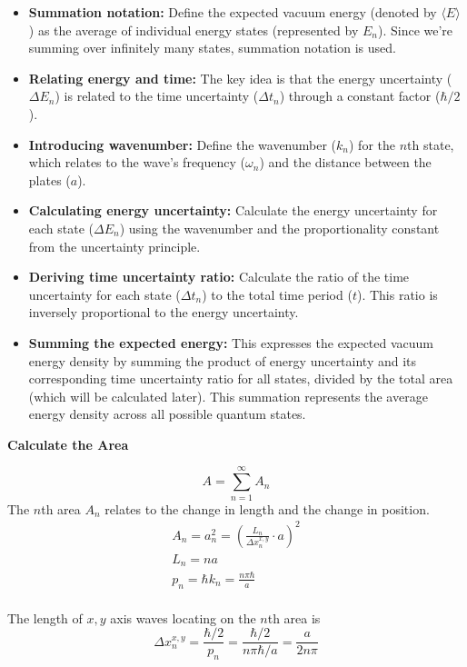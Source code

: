 \begin{itemize}
    \item \textbf{Summation notation:} Define the expected vacuum energy (denoted by $\langle E \rangle$ ) 
    as the average of individual energy states (represented by $E_n$). 
    Since we're summing over infinitely many states, summation notation is used.
    \item \textbf{Relating energy and time:} The key idea is that the energy uncertainty ($\Delta E_n$) is related 
    to the time uncertainty ($\Delta t_n$) through a constant factor ($\hbar/2$).
    \item \textbf{Introducing wavenumber:} Define the wavenumber ($k_n$) for the $n$th state, 
    which relates to the wave's frequency ($\omega_n$) and the distance between the plates ($a$).
    \item \textbf{Calculating energy uncertainty:} Calculate the energy uncertainty for each state ($\Delta E_n$)
     using the wavenumber and the proportionality constant from the uncertainty principle.
    \item \textbf{Deriving time uncertainty ratio:} Calculate the ratio of the time uncertainty for each state ($\Delta t_n$)
     to the total time period ($t$). This ratio is inversely proportional to the energy uncertainty.
    \item \textbf{Summing the expected energy:} This expresses the expected vacuum energy density by summing 
    the product of energy uncertainty and its corresponding time uncertainty ratio for all states, 
    divided by the total area (which will be calculated later). 
    This summation represents the average energy density across all possible quantum states.
\end{itemize}
\noindent\textbf{Calculate the Area}
\par
\[A = \sum_{n=1}^{\infty}A_n\]
The \(n\)th area \(A_n\) relates to the change in length and the change in position.
    \begin{align*}
    &A_n = a_n^2 = (\frac{L_n}{\Delta x_n^{x,y}} \cdot a)^2&\\
    &L_n = n a&\\
    &p_n = \hbar k_n = \frac{n \pi \hbar}{a}&\\
    \end{align*}
    
    The length of $x, y$ axis waves locating on the $n$th area is
    \[\Delta x_n^{x, y} = \frac{\hbar/2}{p_n} = \frac{\hbar/2}{n \pi \hbar/a} = \frac{a}{2 n \pi}\]
    
